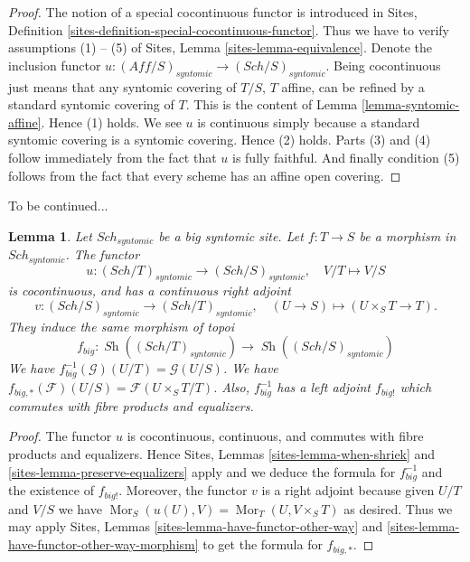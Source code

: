 \documentclass{stacks-project}
\theoremstyle{plain}
\newtheorem{lemma}[subsection]{Lemma}
\theoremstyle{definition}
\theoremstyle{remark}
\numberwithin{equation}{subsection}
\def\Sch{\mathit{Sch}}
\def\Mor{\mathop{\mathrm{Mor}}\nolimits}
\def\Sh{\mathop{\mathit{Sh}}\nolimits}
\begin{document}
\begin{proof}
The notion of a special cocontinuous functor is introduced in
Sites, Definition \ref{sites-definition-special-cocontinuous-functor}.
Thus we have to verify assumptions (1) -- (5) of
Sites, Lemma \ref{sites-lemma-equivalence}.
Denote the inclusion functor
$u : (\textit{Aff}/S)_{syntomic} \to (\Sch/S)_{syntomic}$.
Being cocontinuous just means that any syntomic covering of
$T/S$, $T$ affine, can be refined by a standard syntomic covering of $T$.
This is the content of
Lemma \ref{lemma-syntomic-affine}.
Hence (1) holds. We see $u$ is continuous simply because a standard
syntomic covering is a syntomic covering. Hence (2) holds.
Parts (3) and (4) follow immediately from the fact that $u$ is
fully faithful. And finally condition (5) follows from the
fact that every scheme has an affine open covering.
\end{proof}

\noindent
To be continued...

\begin{lemma}
\label{lemma-morphism-big-syntomic}
Let $\Sch_{syntomic}$ be a big syntomic site.
Let $f : T \to S$ be a morphism in $\Sch_{syntomic}$.
The functor
$$
u : (\Sch/T)_{syntomic} \longrightarrow (\Sch/S)_{syntomic},
\quad
V/T \longmapsto V/S
$$
is cocontinuous, and has a continuous right adjoint
$$
v : (\Sch/S)_{syntomic} \longrightarrow (\Sch/T)_{syntomic},
\quad
(U \to S) \longmapsto (U \times_S T \to T).
$$
They induce the same morphism of topoi
$$
f_{big} :
\Sh((\Sch/T)_{syntomic})
\longrightarrow
\Sh((\Sch/S)_{syntomic})
$$
We have $f_{big}^{-1}(\mathcal{G})(U/T) = \mathcal{G}(U/S)$.
We have $f_{big, *}(\mathcal{F})(U/S) = \mathcal{F}(U \times_S T/T)$.
Also, $f_{big}^{-1}$ has a left adjoint $f_{big!}$ which commutes with
fibre products and equalizers.
\end{lemma}

\begin{proof}
The functor $u$ is cocontinuous, continuous, and commutes with fibre products
and equalizers. Hence
Sites, Lemmas \ref{sites-lemma-when-shriek} and
\ref{sites-lemma-preserve-equalizers}
apply and we deduce the formula
for $f_{big}^{-1}$ and the existence of $f_{big!}$. Moreover,
the functor $v$ is a right adjoint because given $U/T$ and $V/S$
we have $\Mor_S(u(U), V) = \Mor_T(U, V \times_S T)$
as desired. Thus we may apply
Sites, Lemmas \ref{sites-lemma-have-functor-other-way} and
\ref{sites-lemma-have-functor-other-way-morphism} to get the
formula for $f_{big, *}$.
\end{proof}
\end{document}
